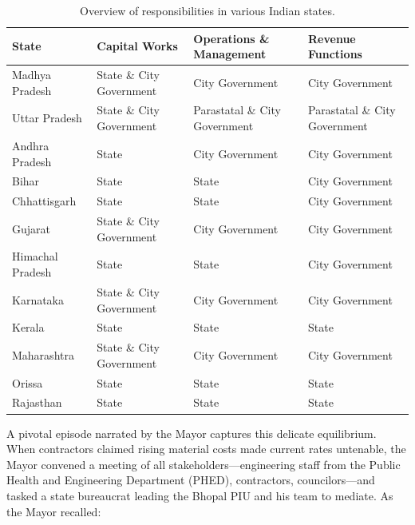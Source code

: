\begin{table}[ht]
\centering
\begin{tabular}{l l l l}
\toprule
\textbf{State} & \textbf{Capital Works} & \textbf{Operations \& Management} & \textbf{Revenue Functions} \\
\midrule
Madhya Pradesh    & State \& City Government        & City Government                   & City Government \\
Uttar Pradesh     & State \& City Government        & Parastatal \& City Government     & Parastatal \& City Government \\
Andhra Pradesh    & State                           & City Government                   & City Government \\
Bihar             & State                           & State                             & City Government \\
Chhattisgarh      & State                           & State                             & City Government \\
Gujarat           & State \& City Government        & City Government                   & City Government \\
Himachal Pradesh  & State                           & State                             & City Government \\
Karnataka         & State \& City Government        & City Government                   & City Government \\
Kerala            & State                           & State                             & State \\
Maharashtra       & State \& City Government        & City Government                   & City Government \\
Orissa            & State                           & State                             & State \\
Rajasthan         & State                           & State                             & State \\
\bottomrule
\end{tabular}
\caption{Overview of responsibilities in various Indian states.}
\label{tab:state-functions}
\end{table}





A pivotal episode narrated by the Mayor captures this delicate equilibrium. When contractors claimed rising material costs made current rates untenable, the Mayor convened a meeting of all stakeholders—engineering staff from the Public Health and Engineering Department (PHED), contractors, councilors—and tasked a state bureaucrat leading the Bhopal PIU and his team to mediate. As the Mayor recalled:

